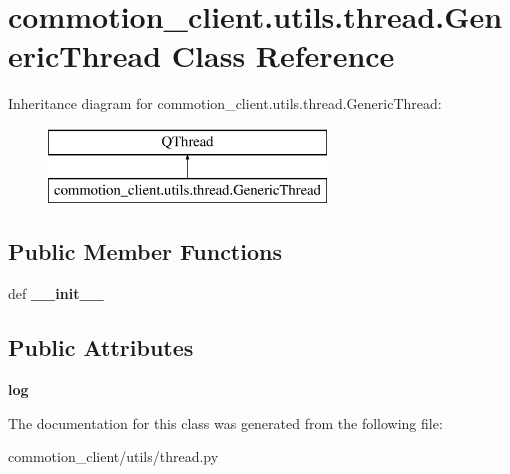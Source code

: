 \hypertarget{classcommotion__client_1_1utils_1_1thread_1_1GenericThread}{\section{commotion\+\_\+client.\+utils.\+thread.\+Generic\+Thread Class Reference}
\label{classcommotion__client_1_1utils_1_1thread_1_1GenericThread}
}
Inheritance diagram for commotion\+\_\+client.\+utils.\+thread.\+Generic\+Thread\+:\begin{figure}[H]
\begin{center}
\leavevmode
\includegraphics[height=2.000000cm]{classcommotion__client_1_1utils_1_1thread_1_1GenericThread}
\end{center}
\end{figure}
\subsection*{Public Member Functions}
\begin{DoxyCompactItemize}
\item 
\hypertarget{classcommotion__client_1_1utils_1_1thread_1_1GenericThread_a671a08f13469e8d618f36d84ce9cecbe}{def {\bfseries \+\_\+\+\_\+init\+\_\+\+\_\+}}\label{classcommotion__client_1_1utils_1_1thread_1_1GenericThread_a671a08f13469e8d618f36d84ce9cecbe}

\end{DoxyCompactItemize}
\subsection*{Public Attributes}
\begin{DoxyCompactItemize}
\item 
\hypertarget{classcommotion__client_1_1utils_1_1thread_1_1GenericThread_ad7535d8328a50a61385d8b5f58435f0c}{{\bfseries log}}\label{classcommotion__client_1_1utils_1_1thread_1_1GenericThread_ad7535d8328a50a61385d8b5f58435f0c}

\end{DoxyCompactItemize}


The documentation for this class was generated from the following file\+:\begin{DoxyCompactItemize}
\item 
commotion\+\_\+client/utils/thread.\+py\end{DoxyCompactItemize}
